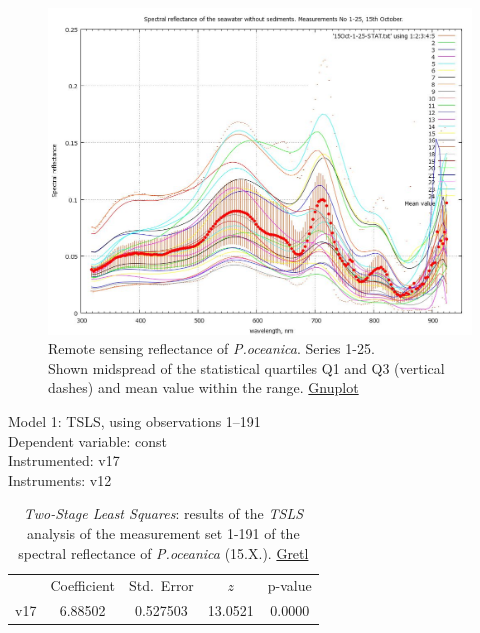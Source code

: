 \documentclass[11pt]{article}
\begin{document}
\begin{appendices}
\begin{figure}[H]
	\begin{center}
		\includegraphics[scale=0.25]{GNU-12.jpg}
		\caption{Remote sensing reflectance of \textit{P.oceanica}. Series 1-25. \\Shown midspread of the statistical quartiles Q1 and Q3 (vertical dashes) and mean value within the range.  \href{http://www.gnuplot.info/}{Gnuplot}­}
		\label{fig:A.26}
	\end{center}
\end{figure}

\begin{table}[htbp]
	\caption{\textit{Two-Stage Least Squares}: results of the \textit{TSLS} analysis of the measurement set 1-191 of the spectral reflectance of \textit{P.oceanica} (15.X.). \href{http://gretl.sourceforge.net/}{Gretl}}
	\begin{center}
		Model 1: TSLS, using observations 1--191\\
		Dependent variable: const\\
		Instrumented: v17 \\
		Instruments: v12 \\

	\vspace{1em}

	\begin{tabular}{|c c c c c|}
		  &  {Coefficient} &  {Std.\ Error} &  {$z$} &    {p-value} \\[1ex]
		v17 &  6.88502 & 0.527503 & 13.0521 & 0.0000 \\
	\end{tabular}


\end{center}
\end{table}
\end{appendices}
\end{document}
